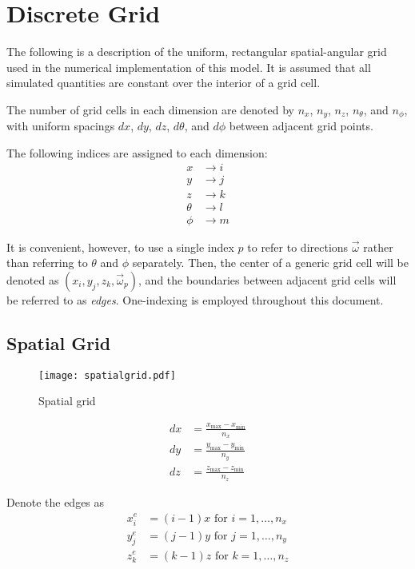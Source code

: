 \section{Discrete Grid}
The following is a description of the uniform, rectangular spatial-angular grid used
in the numerical implementation of this model.
It is assumed that all simulated quantities are constant over the interior of a
grid cell.

The number of grid cells in each dimension are denoted by $n_x$, $n_y$, $n_z$,
$n_\theta$, and $n_\phi$, with uniform spacings $dx$, $dy$, $dz$, $d\theta$, and
$d\phi$ between adjacent grid points.

The following indices are assigned to each dimension:
\begin{align}
  x &\to i \\
  y &\to j \\
  z &\to k \\
  \theta &\to l \\
  \phi &\to m
\end{align}

It is convenient, however, to use a single index $p$ to refer to directions $\vec{\omega}$ rather than referring to $\theta$ and $\phi$ separately.
Then, the center of a generic grid cell will be denoted as
$(x_i, y_j, z_k, \vec{\omega}_p)$, and the boundaries between adjacent grid cells
will be referred to as \textit{edges}.
One-indexing is employed throughout this document.

\subsection{Spatial Grid}
\begin{figure}[H]
  \centering
  \texttt{[image: spatialgrid.pdf]}
  \caption{Spatial grid}
  \label{fig:spatial_grid}
\end{figure}

\begin{align}
  dx &= \frac{x_{\max}-x_{\min}}{n_x} \\ 
  dy &= \frac{y_{\max}-y_{\min}}{n_y} \\ 
  dz &= \frac{z_{\max}-z_{\min}}{n_z}
\end{align}

Denote the edges as 
\begin{align}
  x_i^e &= (i-1)x \mbox{ for } i=1,\ldots,n_x \\
  y_j^e &= (j-1)y \mbox{ for } j=1,\ldots,n_y \\
  z_k^e &= (k-1)z \mbox{ for } k=1,\ldots,n_z 
\end{align}

